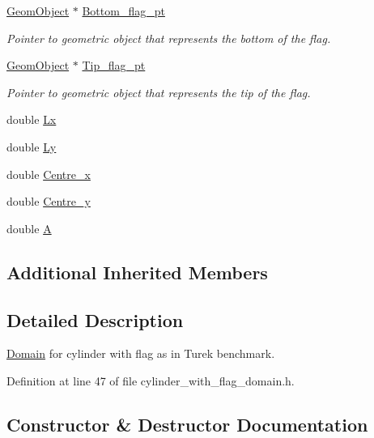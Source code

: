 \begin{DoxyCompactItemize}
\hyperlink{classoomph_1_1GeomObject}{Geom\+Object} $\ast$ \hyperlink{classoomph_1_1CylinderWithFlagDomain_ae4bfb961e03aab16d01fc4662c0214e3}{Bottom\+\_\+flag\+\_\+pt}
\begin{DoxyCompactList}\small\item\em Pointer to geometric object that represents the bottom of the flag. \end{DoxyCompactList}\item 
\hyperlink{classoomph_1_1GeomObject}{Geom\+Object} $\ast$ \hyperlink{classoomph_1_1CylinderWithFlagDomain_a2926eb3a4c171fbc924115f7dfd211a4}{Tip\+\_\+flag\+\_\+pt}
\begin{DoxyCompactList}\small\item\em Pointer to geometric object that represents the tip of the flag. \end{DoxyCompactList}\item 
double \hyperlink{classoomph_1_1CylinderWithFlagDomain_aba284322fcd3d9b9a4231ec71ea6d96b}{Lx}
\item 
double \hyperlink{classoomph_1_1CylinderWithFlagDomain_a733fc387ee7d25811edb6b99c796b242}{Ly}
\item 
double \hyperlink{classoomph_1_1CylinderWithFlagDomain_a9473fc0eb249a20c8a3456c708c8ba6f}{Centre\+\_\+x}
\item 
double \hyperlink{classoomph_1_1CylinderWithFlagDomain_aee096a172eec5ffc3719b625c52beb26}{Centre\+\_\+y}
\item 
double \hyperlink{classoomph_1_1CylinderWithFlagDomain_afdb4b1beb7e574e1bcfc7fbb8a6df700}{A}
\end{DoxyCompactItemize}
\subsection*{Additional Inherited Members}


\subsection{Detailed Description}
\hyperlink{classoomph_1_1Domain}{Domain} for cylinder with flag as in Turek benchmark. 

Definition at line 47 of file cylinder\+\_\+with\+\_\+flag\+\_\+domain.\+h.



\subsection{Constructor \& Destructor Documentation}
\mbox{\label{classoomph_1_1CylinderWithFlagDomain_aa393d14243edaf8b8eaa02c9a01bd869}} 
